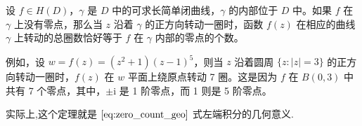 \documentclass[../../main.tex]{subfiles}%
\begin{document}
\begin{theorem}[辐角原理]\label{theorem:辐角原理-定理4.4.2}
设 \( f \in H(D) \)，\( \gamma \) 是 \( D \) 中的可求长简单闭曲线，\( \gamma \) 的内部位于 \( D \) 中。如果 \( f \) 在 \( \gamma \) 上没有零点，那么当 \( z \) 沿着 \( \gamma \) 的正方向转动一圈时，函数 \( f(z) \) 在相应的曲线 \( \gamma \) 上转动的总圈数恰好等于 \( f \) 在 \( \gamma \) 内部的零点的个数。
\end{theorem}
\begin{remark}
例如，设 \(w= f(z) = (z^2 + 1)(z - 1)^5 \)，则当 \( z \) 沿着圆周 \( \{ z: |z| = 3 \} \) 的正方向转动一圈时，\( f(z) \) 在 \( w \) 平面上绕原点转动 7 圈。这是因为 \( f \) 在 \( B(0, 3) \) 中共有 7 个零点，其中，\( \pm \mathrm{i} \) 是 1 阶零点，而 1 则是 5 阶零点。
\end{remark}
\begin{note}
实际上,这个定理就是 \(\eqref{eq:zero_count_geo}\) 式左端积分的几何意义.
\end{note}
\end{document}
